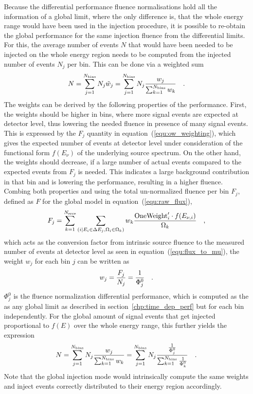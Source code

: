 Because the differential performance fluence normalisations hold all the information of a global limit, where the only difference is, that the whole energy range would have been used in the injection procedure, it is possible to re-obtain the global performance for the same injection fluence from the differential limits.
For this, the average number of events $N$ that would have been needed to be injected on the whole energy region needs to be computed from the injected number of events $N_j$ per bin.
This can be done via a weighted sum
\begin{equation}
  N = \sum_{j=1}^{N_\text{bins}} N_j \tilde{w}_j
    = \sum_{j=1}^{N_\text{bins}}
        N_j \frac{w_j}{\sum_{k=1}^{N_\text{bins}} w_k}
  \quad\text{.}
\end{equation}
The weights can be derived by the following properties of the performance.
First, the weights should be higher in bins, where more signal events are expected at detector level, thus lowering the needed fluence in presence of many signal events.
This is expressed by the $F_j$ quantity in equation~(\ref{equ:ow_weighting}), which gives the expected number of events at detector level under consideration of the functional form $f(E_\nu)$ of the underlying source spectrum.
On the other hand, the weights should decrease, if a large number of actual events compared to the expected events from $F_j$ is needed.
This indicates a large background contribution in that bin and is lowering the performance, resulting in a higher fluence.
Combing both properties and using the total un-normalized fluence per bin $F_j$, defined as $F$ for the global model in equation~(\ref{equ:raw_flux}),
\begin{equation}
  \label{equ:ow_weighting}
  F_j = \sum_{k=1}^{N_\text{srcs}}
          \sum_{(i|E_i\in\Delta E_j, \Omega_i \in \Omega_k)}
            w_k\frac{\text{OneWeight}'_i\cdot f(E_{\nu,i})}{\Omega_k}
  \quad\text{,}
\end{equation}
which acts as the conversion factor from intrinsic source fluence to the measured number of events at detector level as seen in equation~(\ref{equ:flux_to_mu}), the weight $w_j$ for each bin $j$ can be written as
\begin{equation}
  \label{equ:phi_rawflux_nevts}
  w_j = \frac{F_j}{N_j} = \frac{1}{\Phi_j^0}
  \quad\text{.}
\end{equation}
$\Phi_j^0$ is the fluence normalization differential performance, which is computed as the as any global limit as described in section~\ref{chp:time_dep_perf} but for each bin independently.
For the global amount of signal events that get injected proportional to $f(E)$ over the whole energy range, this further yields the expression
\begin{equation}
  \label{equ:n_global_from_n_diff}
  N = \sum_{j=1}^{N_\text{bins}} N_j \frac{w_j}{\sum_{k=1}^{N_\text{bins}} w_k}
    = \sum_{j=1}^{N_\text{bins}} N_j
      \frac{\frac{1}{\Phi_j^0}}{\sum_{k=1}^{N_\text{bins}} \frac{1}{\Phi_k^0}}
  \quad\text{.}
\end{equation}
Note that the global injection mode would intrinsically compute the same weights and inject events correctly distributed to their energy region accordingly.


